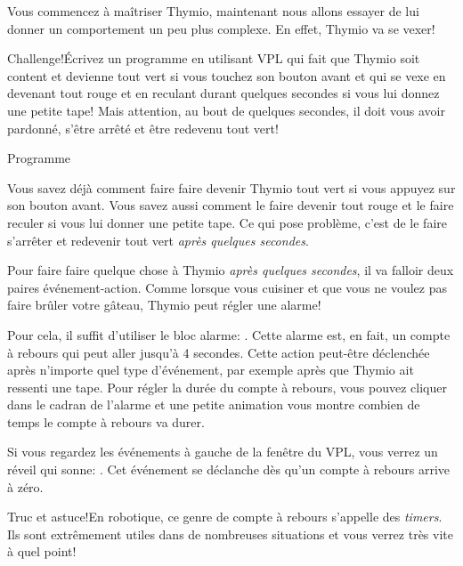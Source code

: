 
Vous commencez à maîtriser Thymio, maintenant nous allons essayer de lui donner un comportement un peu plus complexe. En effet, Thymio va se vexer!

\begin{bclogo}[couleur = pink!30, arrondi = 0.1, logo = \bccrayon, ombre = true]{Challenge!}Écrivez un programme en utilisant VPL qui fait que Thymio soit content et devienne tout vert si vous touchez son bouton avant et qui se vexe en devenant tout rouge et en reculant durant quelques secondes si vous lui donnez une petite tape! Mais attention, au bout de quelques secondes, il doit vous avoir pardonné, s'être arrêté et être redevenu tout vert!
\end{bclogo}

{\raggedleft \hfill Programme }

Vous savez déjà comment faire faire devenir Thymio tout vert si vous appuyez sur son bouton avant. Vous savez aussi comment le faire devenir tout rouge et le faire reculer si vous lui donner une petite tape. Ce qui pose problème, c'est de le faire s'arrêter et redevenir tout vert \textit{après quelques secondes}.

Pour faire faire quelque chose à Thymio \textit{après quelques secondes}, il va falloir deux paires événement-action. Comme lorsque vous cuisiner et que vous ne voulez pas faire brûler votre gâteau, Thymio peut régler une alarme! 

Pour cela, il suffit d'utiliser le bloc alarme: . Cette alarme est, en fait, un compte à rebours qui peut aller jusqu'à 4 secondes. Cette action peut-être déclenchée après n'importe quel type d'événement, par exemple après que Thymio ait ressenti une tape. Pour régler la durée du compte à rebours, vous pouvez cliquer dans le cadran de l'alarme et une petite animation vous montre combien de temps le compte à rebours va durer.

Si vous regardez les événements à gauche de la fenêtre du VPL, vous verrez un réveil qui sonne: . Cet événement se déclanche dès qu'un compte à rebours arrive à zéro.

\begin{bclogo}[couleur = blue!30, arrondi = 0.1, logo = \bcinfo, ombre = true]{Truc et astuce!}En robotique, ce genre de compte à rebours s'appelle des \textit{timers}. Ils sont extrêmement utiles dans de nombreuses situations et vous verrez très vite à quel point!
\end{bclogo}

